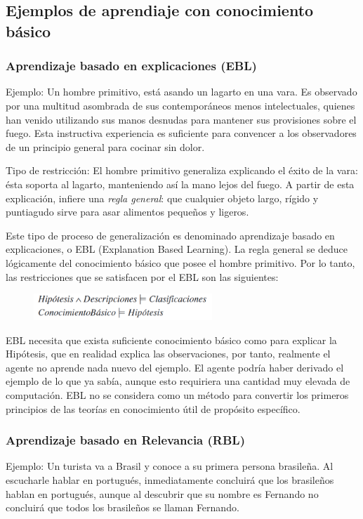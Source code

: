 \documentclass[12 pt, a4paper]{article}
\begin{document}
		\subsection{Ejemplos de aprendiaje con conocimiento básico}
			\subsubsection{Aprendizaje basado en explicaciones (EBL)}
			Ejemplo: Un hombre primitivo, está asando un lagarto en una vara. Es observado por una multitud asombrada de sus contemporáneos menos intelectuales, quienes han venido utilizando sus manos desnudas para mantener sus provisiones sobre el fuego. Esta instructiva experiencia es suficiente para convencer a los observadores de un principio general para cocinar sin dolor.
			
			Tipo de restricción: El hombre primitivo generaliza explicando el éxito de la vara: ésta soporta al lagarto, manteniendo así la mano lejos del fuego. A partir de esta explicación, infiere una \emph{regla general}: que cualquier objeto largo, rígido y puntiagudo sirve para asar alimentos pequeños y ligeros.
			
			Este tipo de proceso de generalización es denominado aprendizaje basado en explicaciones, o EBL (Explanation Based Learning). La regla general se deduce lógicamente del conocimiento básico que posee el hombre primitivo. Por lo tanto, las restricciones que se satisfacen por el EBL son las siguientes:
				\begin{figure}[h]
					\centering
					\includegraphics[width=0.6\textwidth]{./section2/fig3.png}
				\end{figure}
			
			EBL necesita que exista suficiente conocimiento básico como para explicar la Hipótesis, que en realidad explica las observaciones, por tanto, realmente el agente no aprende nada nuevo del ejemplo. El agente podría haber derivado el ejemplo de lo que ya sabía, aunque esto requiriera una cantidad muy elevada de computación. EBL no se considera como un método para convertir los primeros principios de las teorías en conocimiento útil de propósito específico.
			\subsubsection{Aprendizaje basado en Relevancia (RBL)}
			Ejemplo: Un turista va a Brasil y conoce a su primera persona brasileña. Al escucharle hablar en portugués, inmediatamente concluirá que los brasileños hablan en portugués, aunque al descubrir que su nombre es Fernando no concluirá que todos los brasileños se llaman Fernando.
			
\end{document}

